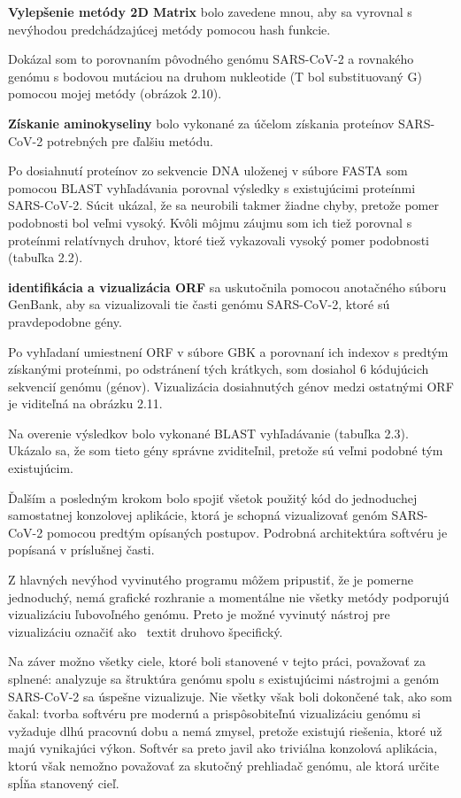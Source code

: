 \textbf{Vylepšenie metódy 2D Matrix } bolo zavedene mnou, aby sa vyrovnal s nevýhodou predchádzajúcej metódy pomocou hash funkcie.

Dokázal som to porovnaním pôvodného genómu SARS-CoV-2 a rovnakého genómu s bodovou mutáciou na druhom nukleotide (T bol substituovaný G) pomocou mojej metódy (obrázok 2.10).

\textbf{Získanie aminokyseliny} bolo vykonané za účelom získania proteínov SARS-CoV-2 potrebných pre ďalšiu metódu.

Po dosiahnutí proteínov zo sekvencie DNA uloženej v súbore FASTA som pomocou BLAST vyhľadávania porovnal výsledky s existujúcimi proteínmi SARS-CoV-2.
Súcit ukázal, že sa neurobili takmer žiadne chyby, pretože pomer podobnosti bol veľmi vysoký.
Kvôli môjmu záujmu som ich tiež porovnal s proteínmi relatívnych druhov, ktoré tiež vykazovali vysoký pomer podobnosti (tabuľka 2.2).

\textbf{identifikácia a vizualizácia ORF} sa uskutočnila pomocou anotačného súboru GenBank, aby sa vizualizovali tie časti genómu SARS-CoV-2, ktoré sú pravdepodobne gény.

Po vyhľadaní umiestnení ORF v súbore GBK a porovnaní ich indexov s predtým získanými proteínmi, po odstránení tých krátkych, som dosiahol 6 kódujúcich sekvencií genómu (génov).
Vizualizácia dosiahnutých génov medzi ostatnými ORF je viditeľná na obrázku 2.11.

Na overenie výsledkov bolo vykonané BLAST vyhľadávanie (tabuľka 2.3).
Ukázalo sa, že som tieto gény správne zviditeľnil, pretože sú veľmi podobné tým existujúcim.

\smallskip

Ďalším a posledným krokom bolo spojiť všetok použitý kód do jednoduchej samostatnej konzolovej aplikácie, ktorá je schopná vizualizovať genóm SARS-CoV-2 pomocou predtým opísaných postupov.
Podrobná architektúra softvéru je popísaná v príslušnej časti.

Z hlavných nevýhod vyvinutého programu môžem pripustiť, že je pomerne jednoduchý, nemá grafické rozhranie a momentálne nie všetky metódy podporujú vizualizáciu ľubovoľného genómu.
Preto je možné vyvinutý nástroj pre vizualizáciu označiť ako \ textit {druhovo špecifický}.

\smallskip
Na záver možno všetky ciele, ktoré boli stanovené v tejto práci, považovať za splnené: analyzuje sa štruktúra genómu spolu s existujúcimi nástrojmi a genóm SARS-CoV-2 sa úspešne vizualizuje.
Nie všetky však boli dokončené tak, ako som čakal: tvorba softvéru pre modernú a prispôsobiteľnú vizualizáciu genómu si vyžaduje dlhú pracovnú dobu a nemá zmysel, pretože existujú riešenia, ktoré už majú vynikajúci výkon.
Softvér sa preto javil ako triviálna konzolová aplikácia, ktorú však nemožno považovať za skutočný prehliadač genómu, ale ktorá určite spĺňa stanovený cieľ.

\label{evaluation}